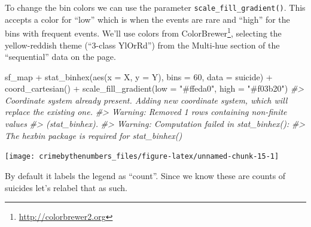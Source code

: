 \documentclass[
]{krantz}
\makeatletter
\newenvironment{Shaded}{\begin{snugshade}}{\end{snugshade}}
\newcommand{\AttributeTok}[1]{\textcolor[rgb]{0.61,0.61,0.61}{#1}}
\newcommand{\CommentTok}[1]{\textcolor[rgb]{0.37,0.37,0.37}{\textit{#1}}}
\newcommand{\DecValTok}[1]{\textcolor[rgb]{0.06,0.06,0.06}{#1}}
\newcommand{\FunctionTok}[1]{\textcolor[rgb]{0,0,0}{#1}}
\newcommand{\NormalTok}[1]{#1}
\newcommand{\SpecialCharTok}[1]{\textcolor[rgb]{0,0,0}{#1}}
\newcommand{\StringTok}[1]{\textcolor[rgb]{0.5,0.5,0.5}{#1}}
\renewcommand{\href}[2]{#2\footnote{\url{#1}}}
\newenvironment{kframe}{%
\medskip{}
\setlength{\fboxsep}{.8em}
 \def\at@end@of@kframe{}%
 \ifinner\ifhmode%
  \def\at@end@of@kframe{\end{minipage}}%
  \begin{minipage}{\columnwidth}%
 \fi\fi%
 \def\FrameCommand##1{\hskip\@totalleftmargin \hskip-\fboxsep
 \colorbox{shadecolor}{##1}\hskip-\fboxsep
     \hskip-\linewidth \hskip-\@totalleftmargin \hskip\columnwidth}%
 \MakeFramed {\advance\hsize-\width
   \@totalleftmargin\z@ \linewidth\hsize
   \@setminipage}}%
 {\par\unskip\endMakeFramed%
 \at@end@of@kframe}
\renewenvironment{Shaded}{\begin{kframe}}{\end{kframe}}
\makeatother
\begin{document}
To change the bin colors we can use the parameter \texttt{scale\_fill\_gradient()}. This accepts a color for ``low'' which is when the events are rare and ``high'' for the bins with frequent events. We'll use colors from \href{http://colorbrewer2.org}{ColorBrewer}, selecting the yellow-reddish theme (``3-class YlOrRd'') from the Multi-hue section of the ``sequential'' data on the page.

\begin{Shaded}
\begin{Highlighting}[]
\NormalTok{sf\_map }\SpecialCharTok{+}
  \FunctionTok{stat\_binhex}\NormalTok{(}\FunctionTok{aes}\NormalTok{(}\AttributeTok{x =}\NormalTok{ X, }\AttributeTok{y =}\NormalTok{ Y),}
              \AttributeTok{bins  =} \DecValTok{60}\NormalTok{,}
              \AttributeTok{data =}\NormalTok{ suicide) }\SpecialCharTok{+}
  \FunctionTok{coord\_cartesian}\NormalTok{() }\SpecialCharTok{+}
  \FunctionTok{scale\_fill\_gradient}\NormalTok{(}\AttributeTok{low =} \StringTok{"\#ffeda0"}\NormalTok{,}
                      \AttributeTok{high =} \StringTok{"\#f03b20"}\NormalTok{)}
\CommentTok{\#\textgreater{} Coordinate system already present. Adding new coordinate system, which will replace the existing one.}
\CommentTok{\#\textgreater{} Warning: Removed 1 rows containing non{-}finite values}
\CommentTok{\#\textgreater{} (stat\_binhex).}
\CommentTok{\#\textgreater{} Warning: Computation failed in \textasciigrave{}stat\_binhex()\textasciigrave{}:}
\CommentTok{\#\textgreater{} The \textasciigrave{}hexbin\textasciigrave{} package is required for \textasciigrave{}stat\_binhex()\textasciigrave{}}
\end{Highlighting}
\end{Shaded}

\begin{center}\texttt{[image: crimebythenumbers\_files/figure-latex/unnamed-chunk-15-1]} \end{center}

By default it labels the legend as ``count''. Since we know these are counts of suicides let's relabel that as such.
\end{document}
